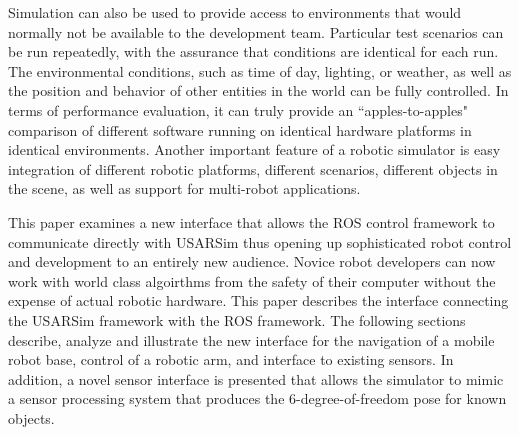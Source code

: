 Simulation can also be used to provide access to environments that would normally not be available to the development team. Particular test scenarios can be run repeatedly, with the assurance that conditions are identical for each run. The environmental conditions, such as time of day, lighting, or weather, as well as the position and behavior of other entities in the world can be fully controlled. In terms of performance evaluation, it can truly provide an ``apples-to-apples" comparison of different software running on identical hardware platforms in identical environments. Another important feature of a robotic simulator is easy integration of different robotic platforms, different scenarios, different objects in the scene, as well
as support for multi-robot applications.

This paper examines a new interface that allows the ROS control framework to communicate directly with USARSim thus opening up sophisticated robot control and development to an entirely new audience. Novice robot developers can now work with world class algoirthms from the safety of their computer without the expense of actual robotic hardware.
This paper describes the interface connecting the USARSim framework with the ROS framework. The following sections describe, analyze and illustrate the new interface for the navigation of a mobile robot base, control of a robotic arm, and interface to existing sensors. In addition, a novel sensor interface is presented that allows the simulator to mimic a sensor processing system that produces the 6-degree-of-freedom pose for known objects.

